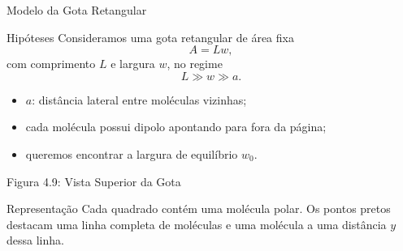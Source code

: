 \documentclass[aspectratio=169]{beamer}
\begin{document}
\begin{frame}{Modelo da Gota Retangular}

\begin{mybox}{Hipóteses}
Consideramos uma gota retangular de área fixa
\[
A=Lw,
\]
com comprimento \(L\) e largura \(w\), no regime
\[
L\gg w\gg a.
\]
\end{mybox}

\begin{itemize}
\item \(a\): distância lateral entre moléculas vizinhas;
\item cada molécula possui dipolo apontando para fora da página;
\item queremos encontrar a largura de equilíbrio \(w_0\).
\end{itemize}

\end{frame}

\begin{frame}{Figura 4.9: Vista Superior da Gota}

\begin{center}
\end{center}

\begin{mybox}{Representação}
Cada quadrado contém uma molécula polar. Os pontos pretos destacam uma linha completa de moléculas e uma molécula a uma distância \(y\) dessa linha.
\end{mybox}

\end{frame}
\end{document}
